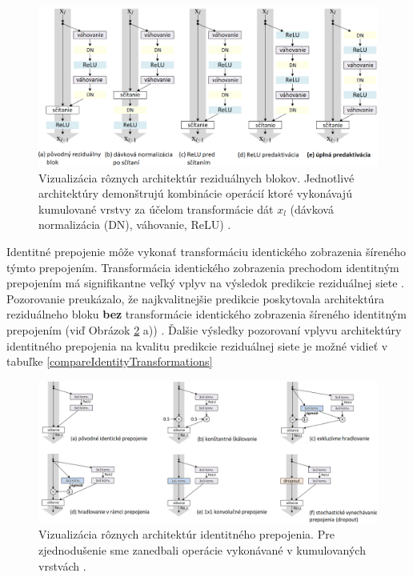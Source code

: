 \begin{figure}
\centerline{\includegraphics[width=1\textwidth]{images/architectures_of_residual_blocks}}
\caption[Vizualizácia rôznych architektúr reziduálnych blokov]{Vizualizácia rôznych architektúr reziduálnych blokov. Jednotlivé architektúry demonštrujú kombinácie operácií ktoré vykonávajú kumulované vrstvy za účelom transformácie dát $x_l$ (dávková normalizácia (DN), váhovanie, ReLU) \cite{He2016}.}
\label{fig:architectures_of_residual_blocks}
\end{figure}

Identitné prepojenie môže vykonať transformáciu identického zobrazenia šíreného týmto prepojením. Transformácia identického zobrazenia prechodom identitným prepojením má signifikantne veľký vplyv na výsledok predikcie reziduálnej siete \cite{He2016}. Pozorovanie preukázalo, že najkvalitnejšie predikcie poskytovala architektúra reziduálneho bloku \textbf{bez} transformácie identického zobrazenia šíreného identitným prepojením (viď Obrázok \ref{fig:achitectures_of_identity_shortcut} a)) \cite{He2016}. Ďalšie výsledky pozorovaní vplyvu architektúry identitného prepojenia na kvalitu predikcie reziduálnej siete je možné vidieť v tabuľke \ref{compareIdentityTransformations}

\begin{figure}
\centerline{\includegraphics[width=1\textwidth]{images/achitectures_of_identity_shortcut}}
\caption[Vizualizácia rôznych architektúr identitneho prepojenia]{Vizualizácia rôznych architektúr identitného prepojenia. Pre zjednodušenie sme zanedbali operácie vykonávané v kumulovaných vrstvách \cite{He2016}.}
\label{fig:achitectures_of_identity_shortcut}
\end{figure}



